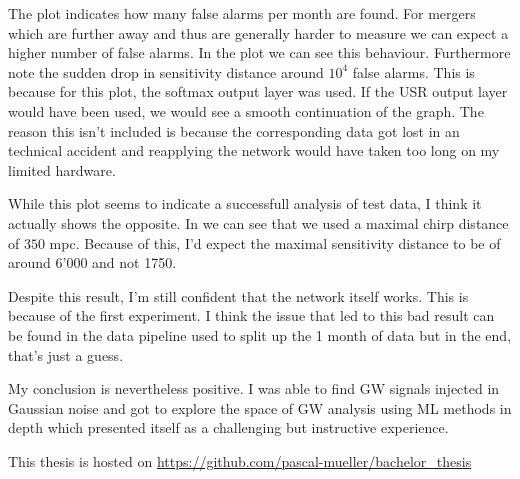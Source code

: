 The plot indicates how many false alarms per month are found. For mergers which
are further away and thus are generally harder to measure we can expect a higher
number of false alarms. In the plot we can see this behaviour. Furthermore note
the sudden drop in sensitivity distance around $10^4$ false alarms. This is
because for this plot, the softmax output layer was used. If the USR output
layer would have been used, we would see a smooth continuation of the graph. The
reason this isn't included is because the corresponding data got lost in an
technical accident and reapplying the network would have taken too long on my
limited hardware.

While this plot seems to indicate a successfull analysis of test data, I think
it actually shows the opposite. In  we can see that
we used a maximal
chirp distance of $350$ mpc. Because of this, I'd expect the maximal
sensitivity distance to be of around 6'000 and not 1750.

Despite this result, I'm still confident that the network itself works. This is
because of the first experiment. I think the issue that led to this bad result
can be found in the data pipeline used to split up the 1 month of data but in
the end, that's just a guess.

My conclusion is nevertheless positive. I was able to find GW signals injected
in Gaussian noise and got to explore the space of GW analysis using ML methods
in depth which presented itself as a challenging but instructive experience.

This thesis is hosted on
\url{https://github.com/pascal-mueller/bachelor_thesis}

